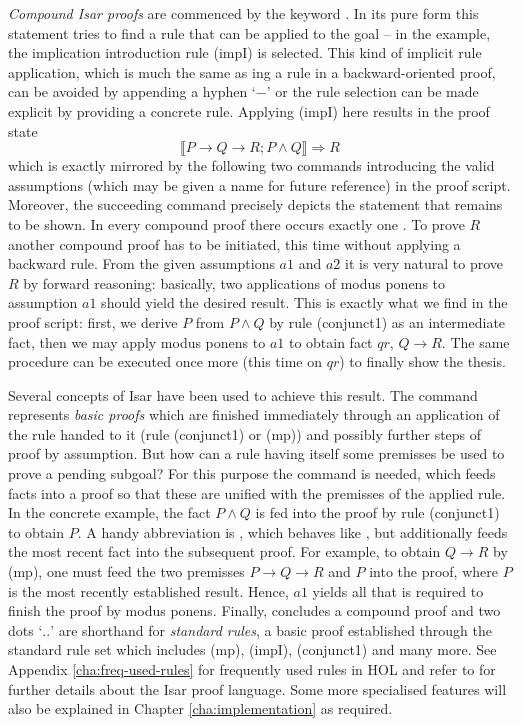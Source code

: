 \emph{Compound Isar proofs} are commenced by the keyword . In
its pure form this statement tries to find a rule that can be applied to the
goal -- in the example, the implication introduction rule (impI) is selected.
This kind of implicit rule application, which is much the same as
ing a rule in a backward-oriented proof, can be avoided by
appending a hyphen `$-$' or the rule selection can be made explicit by providing a
concrete rule. Applying (impI) here results in the \Isabelle proof state
\[
  \llbracket P \longrightarrow Q \longrightarrow R; P \land Q\rrbracket \Longrightarrow R
\]
which is exactly mirrored by the following two  commands
introducing the valid assumptions (which may be given a name for future
reference) in the proof script. Moreover, the succeeding 
command precisely depicts the statement that remains to be shown.  In every
compound proof there occurs exactly one . To prove $R$ another
compound proof has to be initiated, this time without applying a backward rule.
From the given assumptions $\mathit{a1}$ and $\mathit{a2}$ it is very natural to
prove $R$ by forward reasoning: basically, two applications of modus ponens to
assumption $\mathit{a1}$ should yield the desired result. This is exactly what
we find in the proof script: first, we derive $P$ from $P \land Q$ by rule
(conjunct1) as an intermediate fact, then we may apply modus ponens to $a1$ to
obtain fact $\mathit{qr}$, \IE $Q \longrightarrow R$.  The same procedure can be executed once
more (this time on $\mathit{qr}$) to finally show the thesis. 

Several concepts
of Isar have been used to achieve this result. The  command
represents \emph{basic proofs} which are finished immediately through an
application of the rule handed to it (\EG rule (conjunct1) or (mp)) and possibly
further steps of proof by assumption.  But how can a rule having itself some
premisses be used to prove a pending subgoal? For this purpose the
 command is needed, which feeds facts into a proof so that
these are unified with the premisses of the applied rule. In the concrete
example, the fact $P \land Q$ is fed into the proof by rule (conjunct1) to obtain $P$. A
handy abbreviation is , which behaves like ,
but additionally feeds the most recent fact into the subsequent proof. For
example, to obtain $Q \longrightarrow R$ by (mp), one must feed the two premisses $P \longrightarrow Q \longrightarrow R$
and $P$ into the proof, where $P$ is the most recently established result.
Hence,  $\mathit{a1}$ yields all that is required to finish the
proof by modus ponens.  Finally,  concludes a compound proof and
two dots `$..$' are shorthand for  \textit{standard rules}, \IE a
basic proof established through the standard rule set which includes (mp),
(impI), (conjunct1) and many more. See Appendix \ref{cha:freq-used-rules} for
frequently used rules in HOL and refer to \cite{Nipkow03,Wenzel02} for further
details about the Isar proof language. Some more specialised features will also
be explained in Chapter \ref{cha:implementation} as required.




